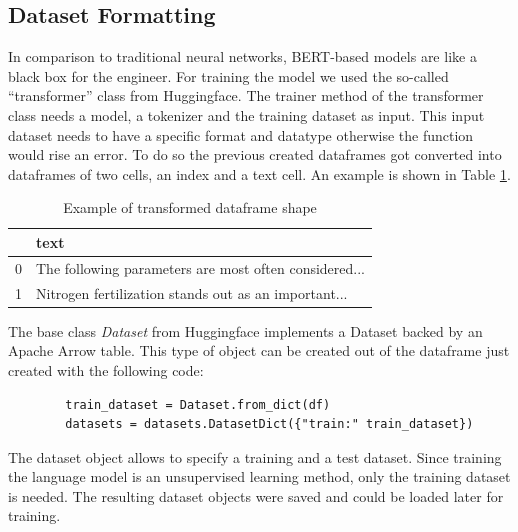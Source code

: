 \subsection{Dataset Formatting}
In comparison to traditional neural networks, BERT-based models are like a black box for the engineer. For training the model we used the so-called “transformer” class from \alert{Huggingface}.  The trainer method of the transformer class needs a model, a tokenizer and the training dataset as input. This input dataset needs to have a specific format and datatype otherwise the function would rise an error.  To do so the previous created dataframes got converted into dataframes of two cells, an index and a text cell. An example is shown in Table \ref{tab:format}.

\begin{table}[H]
	\centering
	\begin{tabular}{ll}
		\hline
		& \textbf{text}                                         \\ \hline
		0 & The following parameters are most often considered... \\ \hline
		1 & Nitrogen fertilization stands out as an important...  \\ \hline
	\end{tabular}
	\caption{Example of transformed dataframe shape}
	\label{tab:format}
\end{table}

The base class \textit{Dataset} from Huggingface implements a Dataset backed by an Apache Arrow table. This type of object can be created out of the dataframe just created with the following code:

\begin{verbatim}
		train_dataset = Dataset.from_dict(df)
		datasets = datasets.DatasetDict({"train:" train_dataset})
\end{verbatim}

The dataset object allows to specify a training and a test dataset. Since training the language model is an unsupervised learning method, only the training dataset is needed. The resulting dataset objects were saved and could be loaded later for training.

